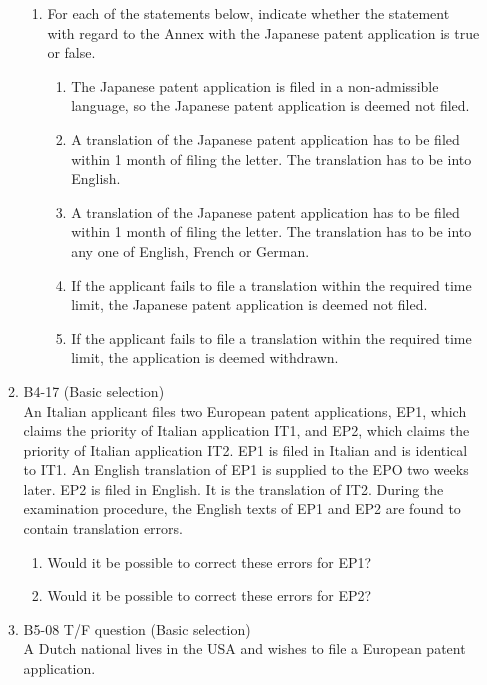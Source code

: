 \documentclass{report}
\begin{document}
\begin{enumerate}[label=\textbf{Question \arabic*}]
\begin{enumerate}[label=\textbf{Question \arabic*}]
\begin{enumerate}[label=(\alph*)]
        \item For each of the statements below, indicate whether the statement with regard to the Annex with the Japanese patent application is true or false.
        \begin{enumerate}[label={(\alph{enumi}.\arabic*)}]
            \item The Japanese patent application is filed in a non-admissible language, so the Japanese patent application is deemed not filed.
            \item A translation of the Japanese patent application has to be filed within 1 month of filing the letter. The translation has to be into English.
            \item A translation of the Japanese patent application has to be filed within 1 month of filing the letter. The translation has to be into any one of English, French or German.
            \item If the applicant fails to file a translation within the required time limit, the Japanese patent application is deemed not filed.
            \item If the applicant fails to file a translation within the required time limit, the application is deemed withdrawn.
        \end{enumerate}
    \end{enumerate}

    \item %
    B4-17 (Basic selection) \\
    An Italian applicant files two European patent applications, EP1, which claims the priority of Italian application IT1, and EP2, which claims the priority of Italian application IT2. 
    EP1 is filed in Italian and is identical to IT1. An English translation of EP1 is supplied to the EPO two weeks later.
    EP2 is filed in English. It is the translation of IT2. 
    During the examination procedure, the English texts of EP1 and EP2 are found to contain translation errors.
    
    \begin{enumerate}[label=(\alph*)]
        \item Would it be possible to correct these errors for EP1?
        \item Would it be possible to correct these errors for EP2?
    \end{enumerate}

    \item %
    B5-08 \quad T/F question (Basic selection) \\
    A Dutch national lives in the USA and wishes to file a European patent application.
    

\end{enumerate}
\end{enumerate}
\end{document}
